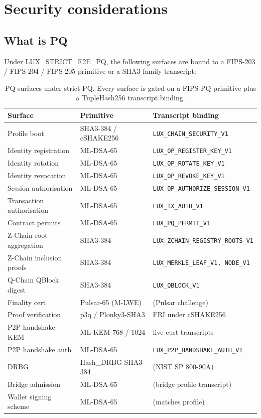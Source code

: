 \section{Security considerations}
\label{sec:security-considerations}

\subsection{What is PQ}

Under LUX\_STRICT\_E2E\_PQ, the following surfaces are bound to a FIPS-203 /
FIPS-204 / FIPS-205 primitive or a SHA3-family transcript:

\begin{table}[H]
\centering
\caption{PQ surfaces under strict-PQ. Every surface is gated on a FIPS-PQ
primitive plus a TupleHash256 transcript binding.}
\label{tab:pq-surfaces}
\begin{tabular}{lll}
\toprule
Surface & Primitive & Transcript binding \\
\midrule
Profile boot                 & SHA3-384 / cSHAKE256 & \texttt{LUX\_CHAIN\_SECURITY\_V1} \\
Identity registration        & ML-DSA-65            & \texttt{LUX\_OP\_REGISTER\_KEY\_V1} \\
Identity rotation            & ML-DSA-65            & \texttt{LUX\_OP\_ROTATE\_KEY\_V1} \\
Identity revocation          & ML-DSA-65            & \texttt{LUX\_OP\_REVOKE\_KEY\_V1} \\
Session authorisation        & ML-DSA-65            & \texttt{LUX\_OP\_AUTHORIZE\_SESSION\_V1} \\
Transaction authorisation    & ML-DSA-65            & \texttt{LUX\_TX\_AUTH\_V1} \\
Contract permits             & ML-DSA-65            & \texttt{LUX\_PQ\_PERMIT\_V1} \\
Z-Chain root aggregation     & SHA3-384             & \texttt{LUX\_ZCHAIN\_REGISTRY\_ROOTS\_V1} \\
Z-Chain inclusion proofs     & SHA3-384             & \texttt{LUX\_MERKLE\_LEAF\_V1, NODE\_V1} \\
Q-Chain QBlock digest        & SHA3-384             & \texttt{LUX\_QBLOCK\_V1} \\
Finality cert                & Pulsar-65 (M-LWE)  & (Pulsar challenge) \\
Proof verification           & p3q / Plonky3-SHA3   & FRI under cSHAKE256 \\
P2P handshake KEM            & ML-KEM-768 / 1024    & five-cust transcripts \\
P2P handshake auth           & ML-DSA-65            & \texttt{LUX\_P2P\_HANDSHAKE\_AUTH\_V1} \\
DRBG                         & Hash\_DRBG-SHA3-384  & (NIST SP 800-90A) \\
Bridge admission             & ML-DSA-65            & (bridge profile transcript) \\
Wallet signing scheme        & ML-DSA-65            & (matches profile) \\
\bottomrule
\end{tabular}
\end{table}


